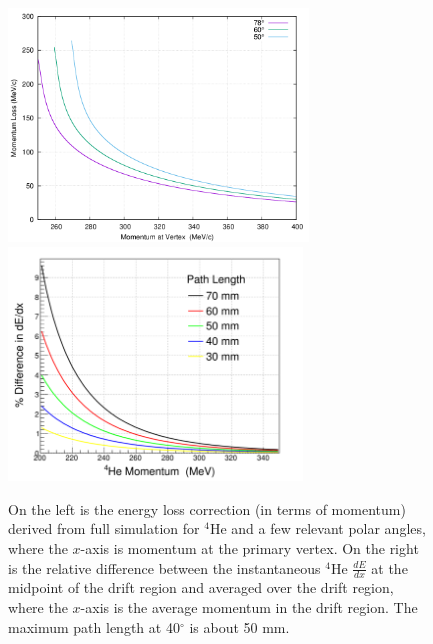 \begin{figure}[tbp]
   \centering
   \includegraphics[height=6.2cm]{fig/eg6eloss_4He_rot.png}
   \includegraphics[height=6.2cm]{fig/Biasbb_alpha.png}
   \caption{On the left is the energy loss correction (in terms of momentum)
   derived from full simulation for $^4$He and a few relevant polar angles, where
   the $x$-axis is momentum at the primary vertex.  On the right is the relative
   difference between the instantaneous $^4$He $\frac{dE}{dx}$ at the midpoint of the
   drift region and averaged over the drift region, where the $x$-axis is the average
   momentum in the drift region.  The maximum path length at 40$^\circ$ is about 50 mm.}
   \label{fig:energylosscorrection}
\end{figure}

